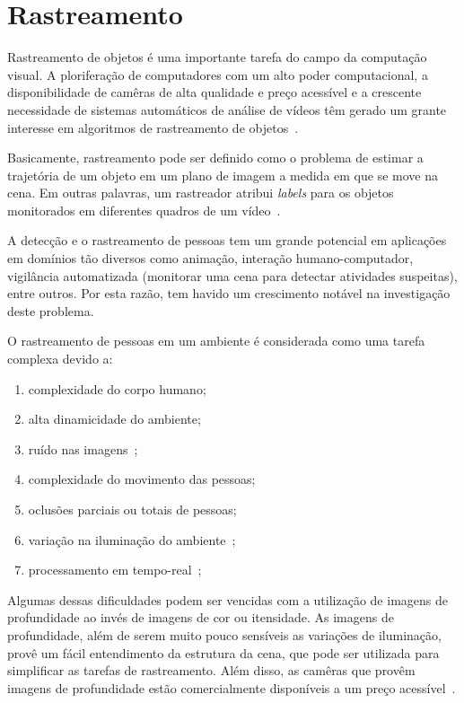 \section {Rastreamento}	

	Rastreamento de objetos é uma importante tarefa do campo da computação visual. A ploriferação de computadores com um alto poder computacional, a disponibilidade de camêras de alta qualidade e preço acessível e a crescente necessidade de sistemas automáticos de análise de vídeos têm gerado um grante interesse em algoritmos de rastreamento de objetos~\cite{yilmaz}.

	Basicamente, rastreamento pode ser definido como o problema de estimar a trajetória de um objeto em um plano de imagem a medida em que se move na cena. Em outras palavras, um rastreador atribui \textit{labels} para os objetos monitorados em diferentes quadros de um vídeo~\cite{yilmaz}.

	A detecção e o rastreamento de pessoas tem um grande potencial em aplicações em domínios tão diversos como animação, interação humano-computador, vigilância automatizada (monitorar uma cena para detectar atividades suspeitas), entre outros. Por esta razão, tem havido um crescimento notável na investigação deste problema.

	O rastreamento de pessoas em um ambiente é considerada como uma tarefa complexa devido a:

		\begin{enumerate}
			\item complexidade do corpo humano;
			\item alta dinamicidade do ambiente;
			\item ruído nas imagens~\cite{yilmaz};
			\item complexidade do movimento das pessoas;
			\item oclusões parciais ou totais de pessoas;
			\item variação na iluminação do ambiente~\cite{yilmaz};
			\item processamento em tempo-real~\cite{yilmaz};
		\end{enumerate}

	Algumas dessas dificuldades podem ser vencidas com a utilização de imagens de profundidade ao invés de imagens de cor ou itensidade. As imagens de profundidade, além de serem muito pouco sensíveis as variações de iluminação, provê um fácil entendimento da estrutura da cena, que pode ser utilizada para simplificar as tarefas de rastreamento. Além disso, as camêras que provêm imagens de profundidade estão comercialmente disponíveis a um preço acessível~\cite{nikos}.

